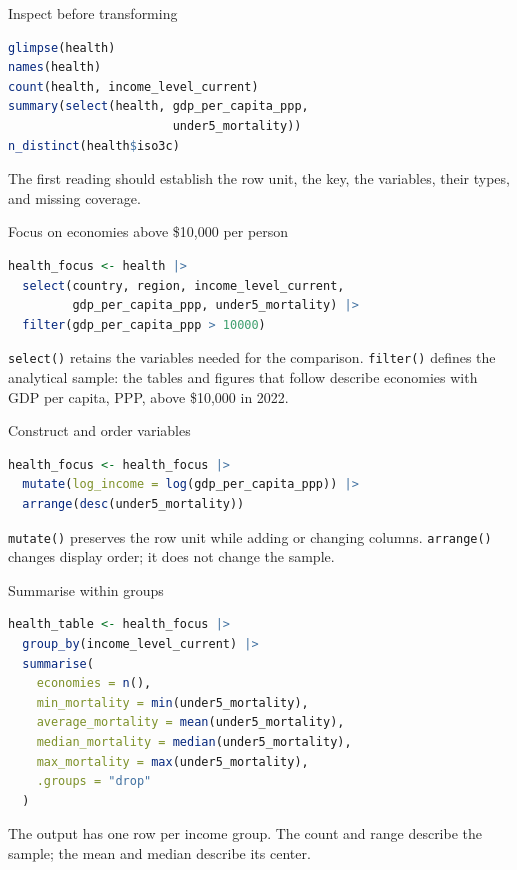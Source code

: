 \begin{frame}[fragile]{Inspect before transforming}
\begin{lstlisting}[language=R]
glimpse(health)
names(health)
count(health, income_level_current)
summary(select(health, gdp_per_capita_ppp,
                       under5_mortality))
n_distinct(health$iso3c)
\end{lstlisting}
The first reading should establish the row unit, the key, the variables, their types, and missing coverage.
\end{frame}

\begin{frame}[fragile]{Focus on economies above \$10,000 per person}
\begin{lstlisting}[language=R]
health_focus <- health |>
  select(country, region, income_level_current,
         gdp_per_capita_ppp, under5_mortality) |>
  filter(gdp_per_capita_ppp > 10000)
\end{lstlisting}
\small \texttt{select()} retains the variables needed for the comparison. \texttt{filter()} defines the analytical sample: the tables and figures that follow describe economies with GDP per capita, PPP, above \$10,000 in 2022.
\end{frame}

\begin{frame}[fragile]{Construct and order variables}
\begin{lstlisting}[language=R]
health_focus <- health_focus |>
  mutate(log_income = log(gdp_per_capita_ppp)) |>
  arrange(desc(under5_mortality))
\end{lstlisting}
\texttt{mutate()} preserves the row unit while adding or changing columns. \texttt{arrange()} changes display order; it does not change the sample.
\end{frame}

\begin{frame}[fragile]{Summarise within groups}
\begin{lstlisting}[language=R]
health_table <- health_focus |>
  group_by(income_level_current) |>
  summarise(
    economies = n(),
    min_mortality = min(under5_mortality),
    average_mortality = mean(under5_mortality),
    median_mortality = median(under5_mortality),
    max_mortality = max(under5_mortality),
    .groups = "drop"
  )
\end{lstlisting}
The output has one row per income group. The count and range describe the sample; the mean and median describe its center.
\end{frame}

